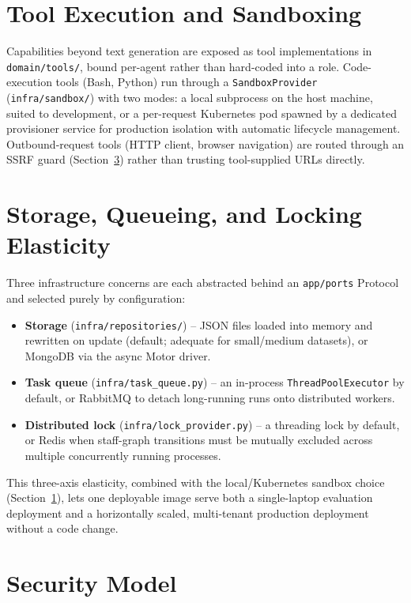 \documentclass[conference]{IEEEtran}
\begin{document}
\section{Tool Execution and Sandboxing}
\label{sec:tools}

Capabilities beyond text generation are exposed as tool implementations in
\texttt{domain/tools/}, bound per-agent rather than hard-coded into a
role. Code-execution tools (Bash, Python) run through a
\texttt{SandboxProvider} (\texttt{infra/sandbox/}) with two modes: a local
subprocess on the host machine, suited to development, or a
per-request Kubernetes pod spawned by a dedicated provisioner service for
production isolation with automatic lifecycle management. Outbound-request
tools (HTTP client, browser navigation) are routed through an SSRF guard
(Section~\ref{sec:security}) rather than trusting tool-supplied URLs
directly.

\section{Storage, Queueing, and Locking Elasticity}
\label{sec:deployment}

Three infrastructure concerns are each abstracted behind an
\texttt{app/ports} Protocol and selected purely by configuration:

\begin{itemize}
    \item \textbf{Storage} (\texttt{infra/repositories/}) -- JSON files
    loaded into memory and rewritten on update (default; adequate for
    small/medium datasets), or MongoDB via the async Motor driver.
    \item \textbf{Task queue} (\texttt{infra/task\_queue.py}) -- an
    in-process \texttt{ThreadPoolExecutor} by default, or RabbitMQ to
    detach long-running runs onto distributed workers.
    \item \textbf{Distributed lock} (\texttt{infra/lock\_provider.py}) -- a
    threading lock by default, or Redis when staff-graph transitions must
    be mutually excluded across multiple concurrently running processes.
\end{itemize}

This three-axis elasticity, combined with the local/Kubernetes sandbox
choice (Section~\ref{sec:tools}), lets one deployable image serve both a
single-laptop evaluation deployment and a horizontally scaled,
multi-tenant production deployment without a code change.

\section{Security Model}
\label{sec:security}
\end{document}
